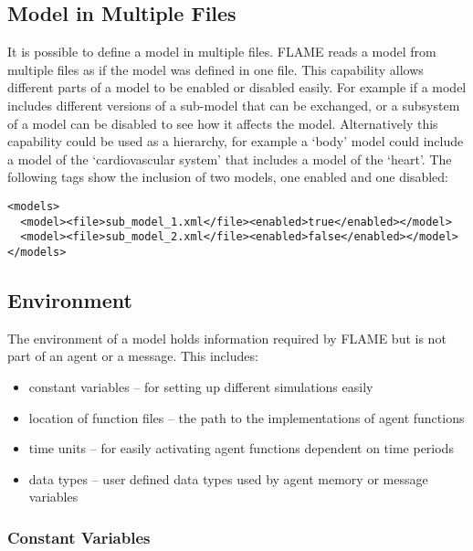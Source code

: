 \subsection{Model in Multiple Files}

It is possible to define a model in multiple files. FLAME reads a model from
multiple files as if the model was defined in one file. This capability allows
different parts of a model to be enabled or disabled easily. For example if a
model includes different versions of a sub-model that can be exchanged, or a
subsystem of a model can be disabled to see how it affects the model.
Alternatively this capability could be used as a hierarchy, for example a `body'
model could include a model of the `cardiovascular system' that includes a
model of the `heart'. The following tags show the inclusion of two models, one
enabled and one disabled:

\begin{mylisting}
\begin{verbatim}
<models>
  <model><file>sub_model_1.xml</file><enabled>true</enabled></model>
  <model><file>sub_model_2.xml</file><enabled>false</enabled></model>
</models>
\end{verbatim}
\end{mylisting}

\subsection{Environment}

The environment of a model holds information required by FLAME but is not part
of an agent or a message. This includes:

\begin{itemize}
\item constant variables -- for setting up different simulations easily
\item location of function files -- the path to the implementations of agent
functions
\item time units -- for easily activating agent functions dependent on time
periods
\item data types -- user defined data types used by agent memory or
message variables
\end{itemize}

\subsubsection{Constant Variables}


